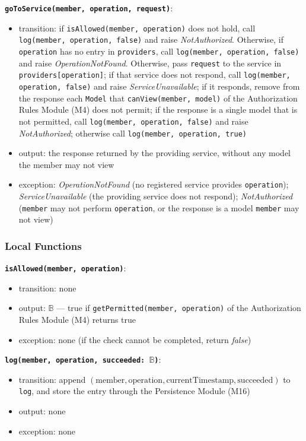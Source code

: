 \documentclass[12pt, titlepage]{article}
\begin{document}
\textbf{\texttt{goToService(member, operation, request)}}:
\begin{itemize}
  \item transition: if \texttt{isAllowed(member, operation)} does not hold, call \texttt{log(member, operation,}\allowbreak\ \texttt{false)} and raise \textit{NotAuthorized}. Otherwise, if \texttt{operation} has no entry in \texttt{providers}, call \texttt{log(member, operation,}\allowbreak\ \texttt{false)} and raise \textit{OperationNotFound}. Otherwise, pass \texttt{request} to the service in \texttt{providers[operation]}; if that service does not respond, call \texttt{log(member, operation,}\allowbreak\ \texttt{false)} and raise \textit{ServiceUnavailable}; if it responds, remove from the response each \texttt{Model} that \texttt{canView(member, model)} of the Authorization Rules Module (M4) does not permit; if the response is a single model that is not permitted, call \texttt{log(member, operation,}\allowbreak\ \texttt{false)} and raise \textit{NotAuthorized}; otherwise call \texttt{log(member, operation, true)}
  \item output: the response returned by the providing service, without any model the member may not view
  \item exception: \textit{OperationNotFound} (no registered service provides \texttt{operation}); \textit{ServiceUnavailable} (the providing service does not respond); \textit{NotAuthorized} (\texttt{member} may not perform \texttt{operation}, or the response is a model \texttt{member} may not view)
\end{itemize}

\subsubsection{Local Functions}

\textbf{\texttt{isAllowed(member, operation)}}:
\begin{itemize}
  \item transition: none
  \item output: $\mathbb{B}$ --- true if \texttt{getPermitted(member, operation)} of the Authorization Rules Module (M4) returns true
  \item exception: none (if the check cannot be completed, return \textit{false})
\end{itemize}

\textbf{\texttt{log(member, operation, succeeded: $\mathbb{B}$)}}:
\begin{itemize}
  \item transition: append $(\text{member}, \text{operation}, \text{currentTimestamp}, \text{succeeded})$ to \texttt{log}, and store the entry through the Persistence Module (M16)
  \item output: none
  \item exception: none
\end{itemize}
\end{document}
